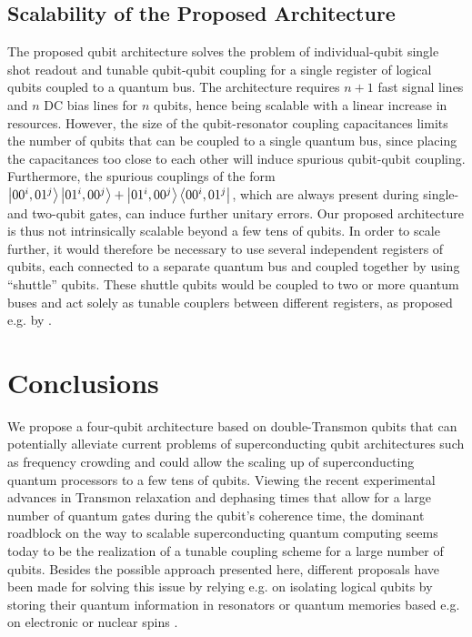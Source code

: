 \subsection{Scalability of the Proposed Architecture}

The proposed qubit architecture solves the problem of individual-qubit single shot readout and tunable qubit-qubit coupling for a single register of logical qubits coupled to a quantum bus. The architecture requires $n+1$ fast signal lines and $n$ DC bias lines for $n$ qubits, hence being scalable with a linear increase in resources. However, the size of the qubit-resonator coupling capacitances limits the number of qubits that can be coupled to a single quantum bus, since placing the capacitances too close to each other will induce spurious qubit-qubit coupling. Furthermore, the spurious couplings of the form $\left| 00^i,01^j \right>\left| 01^i,00^j \right>+\left| 01^i,00^j \right>\left< 00^i,01^j \right|$, which are always present during single- and two-qubit gates, can induce further unitary errors. Our proposed architecture is thus not intrinsically scalable beyond a few tens of qubits. In order to scale further, it would therefore be necessary to use several independent registers of qubits, each connected to a separate quantum bus and coupled together by using ``shuttle'' qubits. These shuttle qubits would be coupled to two or more quantum buses and act solely as tunable couplers between different registers, as proposed e.g. by \citep{divincenzo_physical_2000,palacios-laloy_superconducting_2010}.

\section{Conclusions}

We propose a four-qubit architecture based on double-Transmon qubits that can potentially alleviate current problems of superconducting qubit architectures such as frequency crowding and could allow the scaling up of superconducting quantum processors to a few tens of qubits. Viewing the recent experimental advances in Transmon relaxation and dephasing times \citep{paik_observation_2011} that allow for a large number of quantum gates during the qubit's coherence time, the dominant roadblock on the way to scalable superconducting quantum computing seems today to be the realization of a tunable coupling scheme for a large number of qubits. Besides the possible approach presented here, different proposals have been made for solving this issue by relying e.g. on isolating logical qubits by storing their quantum information in resonators \citep{galiautdinov_resonatorzero-qubit_2012,mariantoni_implementing_2011} or quantum memories based e.g. on electronic or nuclear spins \citep{zhu_coherent_2011,kubo_storage_2012,kubo_hybrid_2011}.